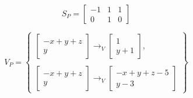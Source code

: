 \begin{center}
	\begin{minipage}{0.3\linewidth}
		\begin{equation*}
		S_P = 
			\begin{bmatrix}
				-1 & 1 & 1 \\
				0 & 1 & 0
			\end{bmatrix}
		\end{equation*}
	\end{minipage}
	\begin{minipage}{0.6\linewidth}
		\begin{equation*}
		    V_P = \begin{Bmatrix}
		              \begin{bmatrix}
		                    - x + y + z \\
		                    y
		               \end{bmatrix} \rightarrow_V
		               \begin{bmatrix}
		                     1 \\
		                     y + 1
		               \end{bmatrix}, \\ \\
		               \begin{bmatrix}
		                     - x + y + z \\
		                    y
		               \end{bmatrix} \rightarrow_V
		               \begin{bmatrix}
		                    - x + y + z - 5 \\
		                    y - 3
		              \end{bmatrix}
		    \end{Bmatrix}
		\end{equation*}
	\end{minipage}
\end{center}

